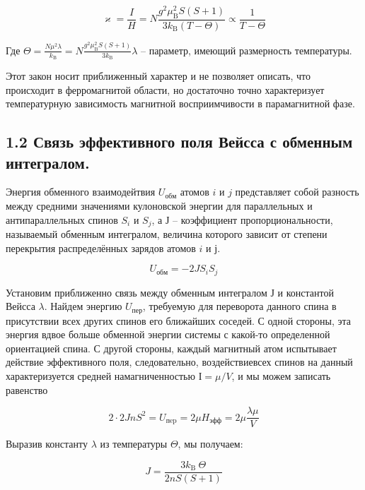 \documentclass[a4paper,12pt]{article}
\begin{document}
\begin{equation}\label{C-W}
    \varkappa=\frac{I}{H}=N \frac{g^{2} \mu_{\mathrm{B}}^{2} S(S+1)}{3 k_{\mathrm{B}}(T-\Theta)} \propto \frac{1}{T-\Theta}
\end{equation}

Где $\Theta=\frac{N \mu^{2} \lambda}{k_{\mathrm{B}}}=N \frac{g^{2} \mu_{\mathrm{B}}^{2} S(S+1)}{3 k_{\mathrm{B}}} \lambda$ -- параметр, имеющий размерность температуры.

Этот закон носит приближенный характер и не позволяет описать, что происходит в ферромагнитой области, но достаточно точно характеризует температурную зависимость магнитной восприимчивости в парамагнитной фазе. 

\subsection*{1.2 Связь эффективного поля Вейсса с обменным интегралом.}

Энергия обменного взаимодейтвия $U_\text{обм}$ атомов $i$ и $j$ представляет собой разность между средними значениями кулоновской энергии для параллельных и антипараллельных спинов $S_i$ и $S_j$, а $Ј$ -- коэффициент пропорциональности, называемый обменным интегралом, величина которого зависит от степени перекрытия распределённых зарядов атомов $i$ и $ј$.

\begin{equation}\label{energy}
    U_\text{обм} = -2 J S_i S_j
\end{equation}

Установим приближенно связь между обменным интегралом $Ј$ и константой Вейсса $\lambda$. Найдем энергию $U_\text{пер}$, требуемую для переворота данного спина в присутствии всех других спинов его ближайших соседей. С одной стороны, эта энергия вдвое больше обменной энергии системы с какой-то определенной ориентацией спина. С другой стороны, каждый магнитный атом испытывает действие эффективного поля, следовательно, воздействиевсех спинов на данный характеризуется средней намагниченностью $І=\mu/V$, и мы можем записать равенство

$$2\cdot2Jn S^2 = U_{\text{пep}}=2 \mu H_{\text{эфф}} =2 \mu \frac{\lambda \mu}{V}$$

Выразив константу $\lambda$ из температуры $\Theta$, мы получаем:

\begin{equation}\label{obm-int}
    J=\frac{3 k_{\text {B }} \Theta}{2 n S(S+1)}
\end{equation}
\end{document}
